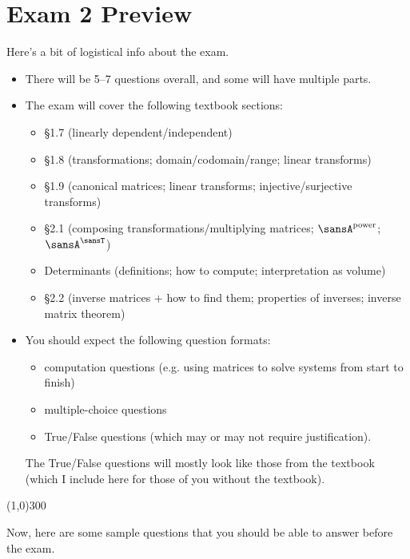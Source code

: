 \documentclass[12pt]{article}
\theoremstyle{definition}
\theoremstyle{underl}
\begin{document}
	\section*{\centering Exam 2 Preview}
	
	\noindent Here's a bit of logistical info about the exam.
	\begin{itemize}[topsep=0.125in,itemsep=0.625mm]
		\item There will be 5--7 questions overall, and some will have multiple parts.
		\item The exam will cover the following textbook sections: 
		\begin{itemize}[topsep=0mm]
			\item \S1.7 (linearly dependent/independent)
			\item \S1.8 (transformations; domain/codomain/range; linear transforms)
			\item \S1.9 (canonical matrices; linear transforms; injective/surjective transforms)
			\item \S2.1 (composing transformations/multiplying matrices; $\sansA^\text{power}$; $\sansA^\sansT$)
			\item Determinants (definitions; how to compute; interpretation as volume)
			\item \S2.2 (inverse matrices + how to find them; properties of inverses; inverse matrix theorem)
		\end{itemize}
		\item You should expect the following question formats:
		\begin{itemize}[topsep=0mm]
			\item computation questions (e.g. using matrices to solve systems from start to finish)
			\item multiple-choice questions
			\item True/False questions (which may or may not require justification).
		\end{itemize}
		The True/False questions will mostly look like those from the textbook (which I include here for those of you without the textbook).
	\end{itemize}
	
	\vspace{0.25in}
	\begin{center}
		\line(1,0){300}
	\end{center}
	\vspace{0.5in}
	
	\noindent Now, here are some sample questions that you should be able to answer before the exam.
	
\end{document}
